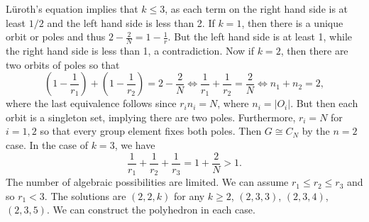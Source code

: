 L\"uroth's equation implies that $k \leq 3$, as each term on the right hand side is at least $1/2$ and the left hand side is less than 2. If $k=1$, then there is a unique orbit or poles and thus $2- \frac{2}{N}= 1- \frac{1}{r}$. But the left hand side is at least 1, while the right hand side is less than 1, a contradiction. Now if $k=2$, then there are two orbits of poles so that
	\[
	\left(1-\dfrac{1}{r_1}\right) + \left(1-\dfrac{1}{r_2}\right)= 2-\dfrac{2}{N} \Longleftrightarrow \dfrac{1}{r_1} + \dfrac{1}{r_2} = \dfrac{2}{N} \Longleftrightarrow n_1+n_2 =2,
	\]
where the last equivalence follows since $r_in_i=N$, where $n_i=|O_i|$. But then each orbit is a singleton set, implying there are two poles. Furthermore, $r_i=N$ for $i=1,2$ so that every group element fixes both poles. Then $G \cong C_N$ by the $n=2$ case. In the case of $k=3$, we have
	\[
	\dfrac{1}{r_1} + \dfrac{1}{r_2} + \dfrac{1}{r_3} = 1 + \dfrac{2}{N}>1.
	\]
The number of algebraic possibilities are limited. We can assume $r_1 \leq r_2 \leq r_3$ and so $r_1<3$. The solutions are $(2,2,k)$ for any $k \geq 2$, $(2,3,3)$, $(2,3,4)$, $(2,3,5)$. We can construct the polyhedron in each case. 
